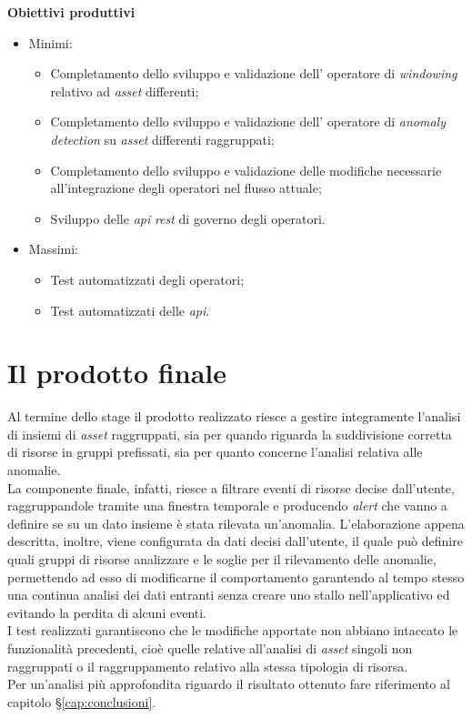 \noindent \textbf{Obiettivi produttivi}
\begin{itemize}
	\item{Minimi:
		\begin{itemize}
			\item{Completamento dello sviluppo e validazione dell' operatore di \textit{windowing} relativo ad \textit{asset} differenti;}
			\item{Completamento dello sviluppo e validazione dell' operatore di \textit{anomaly detection} su \textit{asset} differenti raggruppati;}
			\item{Completamento dello sviluppo e validazione delle modifiche necessarie all'integrazione degli operatori nel flusso attuale;}
			\item{Sviluppo delle \textit{\gls{api}} \textit{\gls{rest}} di governo degli operatori.}
		\end{itemize}			
	}
	\item{Massimi:
		\begin{itemize}
			\item{Test automatizzati degli operatori;}
			\item{Test automatizzati delle \textit{\gls{api}}.}
		\end{itemize}			
	}
\end{itemize}




\section{Il prodotto finale}
Al termine dello stage il prodotto realizzato riesce a gestire integramente l'analisi di insiemi di \textit{asset} raggruppati, sia per quando riguarda la suddivisione corretta di risorse in gruppi prefissati, sia per quanto concerne l'analisi relativa alle anomalie.\\
La componente finale, infatti, riesce a filtrare eventi di risorse decise dall'utente, raggruppandole tramite una finestra temporale e producendo \textit{alert} che vanno a definire se su un dato insieme è stata rilevata un'anomalia. L'elaborazione appena descritta, inoltre, viene configurata da dati decisi dall'utente, il quale può definire quali gruppi di risorse analizzare e le soglie per il rilevamento delle anomalie, permettendo ad esso di modificarne il comportamento garantendo al tempo stesso una continua analisi dei dati entranti senza creare uno stallo nell'applicativo ed evitando la perdita di alcuni eventi.\\
I test realizzati garantiscono che le modifiche apportate non abbiano intaccato le funzionalità precedenti, cioè quelle relative all'analisi di \textit{asset} singoli non raggruppati o il raggruppamento relativo alla stessa tipologia di risorsa.\\
Per un'analisi più approfondita riguardo il risultato ottenuto fare riferimento al capitolo \S\ref{cap:conclusioni}.




